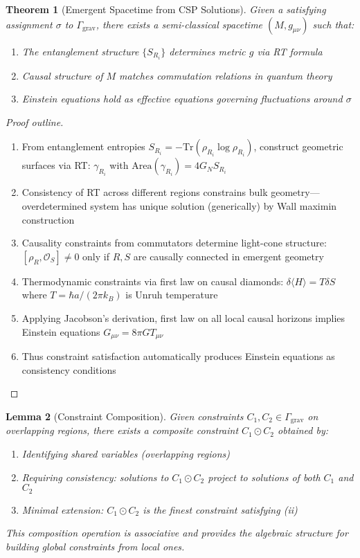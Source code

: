 \documentclass[11pt,a4paper]{article}
\newtheorem{theorem}{Theorem}[section]
\newtheorem{lemma}[theorem]{Lemma}
\theoremstyle{remark}
\theoremstyle{definition}
\begin{document}
\begin{theorem}[Emergent Spacetime from CSP Solutions]
\label{thm:emergent_spacetime}
Given a satisfying assignment $\sigma$ to $\Gamma_{\text{grav}}$, there exists a semi-classical spacetime $(M, g_{\mu\nu})$ such that:
\begin{enumerate}[label=(\roman*)]
\item The entanglement structure $\{S_{R_i}\}$ determines metric $g$ via RT formula
\item Causal structure of $M$ matches commutation relations in quantum theory
\item Einstein equations hold as effective equations governing fluctuations around $\sigma$
\end{enumerate}
\end{theorem}

\begin{proof}[Proof outline]
\begin{enumerate}
\item From entanglement entropies $S_{R_i} = -\text{Tr}(\rho_{R_i} \log \rho_{R_i})$, construct geometric surfaces via RT: $\gamma_{R_i}$ with $\text{Area}(\gamma_{R_i}) = 4G_N S_{R_i}$
\item Consistency of RT across different regions constrains bulk geometry—overdetermined system has unique solution (generically) by Wall maximin construction
\item Causality constraints from commutators determine light-cone structure: $[\rho_R, \mathcal{O}_S] \neq 0$ only if $R, S$ are causally connected in emergent geometry
\item Thermodynamic constraints via first law on causal diamonds: $\delta \langle H \rangle = T \delta S$ where $T = \hbar a/(2\pi k_B)$ is Unruh temperature
\item Applying Jacobson's derivation, first law on all local causal horizons implies Einstein equations $G_{\mu\nu} = 8\pi G T_{\mu\nu}$
\item Thus constraint satisfaction automatically produces Einstein equations as consistency conditions
\end{enumerate}
\end{proof}

\begin{lemma}[Constraint Composition]
Given constraints $C_1, C_2 \in \Gamma_{\text{grav}}$ on overlapping regions, there exists a composite constraint $C_1 \odot C_2$ obtained by:
\begin{enumerate}[label=(\roman*)]
\item Identifying shared variables (overlapping regions)
\item Requiring consistency: solutions to $C_1 \odot C_2$ project to solutions of both $C_1$ and $C_2$
\item Minimal extension: $C_1 \odot C_2$ is the finest constraint satisfying (ii)
\end{enumerate}
This composition operation is associative and provides the algebraic structure for building global constraints from local ones.
\end{lemma}
\end{document}

